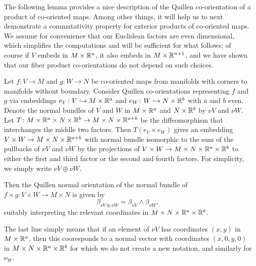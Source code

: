 The following lemma provides a nice description of the Quillen co-orientation of a product of co-oriented maps.
Among other things, it will help us to next demonstrate a commutativity property for exterior products of co-oriented maps.
We assume for convenience that our Euclidean factors are even dimensional, which simplifies the computations and will be sufficient for what follows; of course if $V$ embeds in $M \times \mathbb{R}^n$, it also embeds in $M \times \mathbb{R}^{n+1}$, and we have shown that our fiber product co-orientations do not depend on such choices. 

\begin{lemma}\label{L: Quillen product co-orientation}
	Let $f \colon V \to M$ and $g \colon W \to N$ be co-oriented maps from manifolds with corners to manifolds without boundary.
	Consider Quillen co-orientations representing $f$ and $g$ via embeddings $e_V \colon V \hookrightarrow M \times \mathbb{R}^a$ and $e_W \colon W \hookrightarrow N \times \mathbb{R}^b$ with $a$ and $b$ even.
	Denote the normal bundles of $V$ and $W$ in $M \times \mathbb{R}^a$ and $N \times \mathbb{R}^b$ by $\nu V$ and $\nu W$.
	Let $T \colon M \times \mathbb{R}^a \times N \times \mathbb{R}^b \to M \times N \times \mathbb{R}^{a+b}$ be the diffeomorphism that interchanges the middle two factors.
	Then
	$T(e_V \times e_W)$ gives an embedding $V \times W \to M \times N \times \mathbb{R}^{a+b}$ with normal bundle isomorphic to the sum of the pullbacks of $\nu V$ and $\nu W$ by the projections of $V \times W \to M \times N \times \mathbb{R}^a \times \mathbb{R}^b$ to either the first and third factor or the second and fourth factors.
	For simplicity, we simply write $\nu V \oplus \nu W$.

	Then the Quillen normal orientation of the normal bundle of $f \times g \colon V \times W \to M \times N$ is given by $$\beta_{\nu V \oplus \nu W} = \beta_{\nu V} \wedge \beta_{\nu W},$$
	suitably interpreting the relevant coordinates in $M \times N \times \mathbb{R}^a \times \mathbb{R}^b$.
\end{lemma}

The last line simply means that if an element of $\nu V$ has coordinates $(x,y)$ in $M \times \mathbb{R}^a$, then this cooresponds to a normal vector with coordinates $(x,0,y,0)$ in $M \times N \times \mathbb{R}^a \times \mathbb{R}^b$ for which we do not create a new notation, and similarly for $\nu_W$. 

